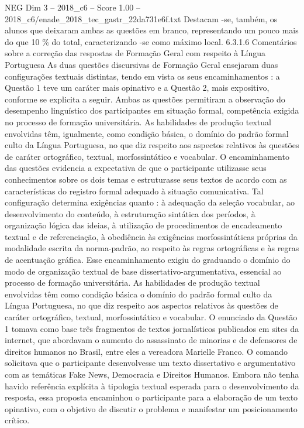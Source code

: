 \begin{textsample}{NEG Dim 3 – 2018\_c6 – Score 1.00 – 2018\_c6/enade\_2018\_tec\_gastr\_22da731e6f.txt}
Destacam -se, também, os alunos que deixaram ambas as questões em branco, representando um pouco mais do que 10 \% do total, caracterizando -se como máximo local. 6.3.1.6 Comentários sobre a correção das respostas de Formação Geral com respeito à Língua Portuguesa As duas questões discursivas de Formação Geral ensejaram duas configurações textuais distintas, tendo em vista os seus encaminhamentos : a Questão 1 teve um caráter mais opinativo e a Questão 2, mais expositivo, conforme se explicita a seguir.
Ambas as questões permitiram a observação do desempenho linguístico dos participantes em situação formal, competência exigida no processo de formação universitária.
As habilidades de produção textual envolvidas têm, igualmente, como condição básica, o domínio do padrão formal culto da Língua Portuguesa, no que diz respeito aos aspectos relativos às questões de caráter ortográfico, textual, morfossintático e vocabular.
O encaminhamento das questões evidencia a expectativa de que o participante utilizasse seus conhecimentos sobre os dois temas e estruturasse seus textos de acordo com as características do registro formal adequado à situação comunicativa.
Tal configuração determina exigências quanto : à adequação da seleção vocabular, ao desenvolvimento do conteúdo, à estruturação sintática dos períodos, à organização lógica das ideias, à utilização de procedimentos de encadeamento textual e de referenciação, à obediência às exigências morfossintáticas próprias da modalidade escrita da norma-padrão, ao respeito às regras ortográficas e às regras de acentuação gráfica.
Esse encaminhamento exigiu do graduando o domínio do modo de organização textual de base dissertativo-argumentativa, essencial ao processo de formação universitária.
As habilidades de produção textual envolvidas têm como condição básica o domínio do padrão formal culto da Língua Portuguesa, no que diz respeito aos aspectos relativos às questões de caráter ortográfico, textual, morfossintático e vocabular.
O enunciado da Questão 1 tomava como base três fragmentos de textos jornalísticos publicados em sites da internet, que abordavam o aumento do assassinato de minorias e de defensores de direitos humanos no Brasil, entre eles a vereadora Marielle Franco.
O comando solicitava que o participante desenvolvesse um texto dissertativo e argumentativo com as temáticas Fake News, Democracia e Direitos Humanos.
Embora não tenha havido referência explícita à tipologia textual esperada para o desenvolvimento da resposta, essa proposta encaminhou o participante para a elaboração de um texto opinativo, com o objetivo de discutir o problema e manifestar um posicionamento crítico.

\end{textsample}
